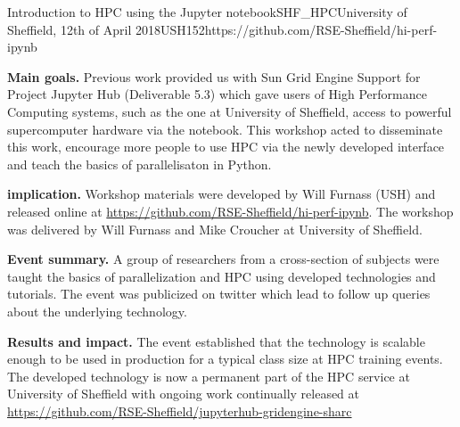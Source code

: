 \begin{event}{Introduction to HPC using the Jupyter notebook}{SHF_HPC}{University of Sheffield, 12th of April 2018}{USH}{15}{2}{https://github.com/RSE-Sheffield/hi-perf-ipynb}

\textbf{Main goals.} Previous \ODK work provided us with Sun Grid Engine Support for Project Jupyter Hub (Deliverable 5.3) which gave users of High Performance Computing systems, such as the one at University of Sheffield, access to powerful supercomputer hardware via the notebook. This workshop acted to disseminate this work, encourage more people to use HPC via the newly developed interface and teach the basics of parallelisaton in Python.

\textbf{\ODK implication.} Workshop materials were developed by Will Furnass (USH) and released online at \url{https://github.com/RSE-Sheffield/hi-perf-ipynb}. The workshop was delivered by Will Furnass and Mike Croucher at University of Sheffield.

\textbf{Event summary.} A group of researchers from a cross-section of subjects were taught the basics of parallelization and HPC using \ODK developed technologies and tutorials. The event was publicized on twitter which lead to follow up queries about the underlying technology.

\textbf{Results and impact.} The event established that the technology is scalable enough to be used in production for a typical class size at HPC training events. The \ODK developed technology is now a permanent part of the HPC service at University of Sheffield with ongoing work continually released at \url{https://github.com/RSE-Sheffield/jupyterhub-gridengine-sharc}

\end{event}
